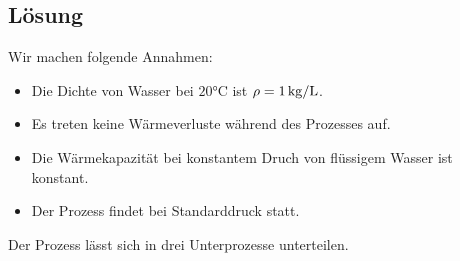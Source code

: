 \documentclass[german,12pt]{homework}
\begin{document}
    \subsection*{Lösung} Wir machen folgende Annahmen:
    \begin{itemize}
        \item Die Dichte von Wasser bei \(20\si{\degreeCelsius}\) ist \(\rho =
        1\,\si{\kg\per{\liter}}\).
        \item Es treten keine Wärmeverluste während des Prozesses auf.
        \item Die Wärmekapazität bei konstantem Druch von flüssigem Wasser ist
        konstant.
        \item Der Prozess findet bei Standarddruck statt.
    \end{itemize}
    Der Prozess lässt sich in drei Unterprozesse unterteilen.
\end{document}
